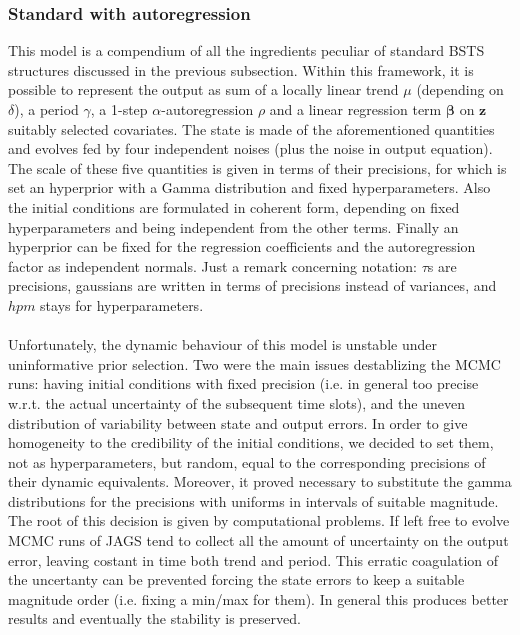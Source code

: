 \documentclass[11pt,twoside]{report}
\begin{document}
\subsubsection{Standard with autoregression}
This model is a compendium of all the ingredients peculiar of standard BSTS structures discussed in the previous subsection. Within this framework, it is possible to represent the output as sum of a locally linear trend $ \mu $ (depending on $ \delta $), a period $ \gamma $, a 1-step $ \alpha $-autoregression $ \rho $ and a linear regression term $ \boldsymbol{\beta} $ on $ \mathbf{z}$ suitably selected covariates. The state is made of the aforementioned quantities and evolves fed by four independent noises (plus the noise in output equation). The scale of these five quantities is given in terms of their precisions, for which is set an hyperprior with a Gamma distribution and fixed hyperparameters. Also the initial conditions are formulated in coherent form, depending on fixed hyperparameters and being independent from the other terms. Finally an hyperprior can be fixed for the regression coefficients and the autoregression factor as independent normals. Just a remark concerning  notation: $ \tau $s are precisions, gaussians are written in terms of precisions instead of variances, and $ hpm $ stays for hyperparameters.\\
\\
Unfortunately, the dynamic behaviour of this model is unstable under uninformative prior selection. Two were the main issues destablizing the MCMC runs: having initial conditions with fixed precision (i.e. in general too precise w.r.t. the actual uncertainty of the subsequent time slots), and the uneven distribution of variability between state and output errors. In order to give homogeneity to the credibility of the initial conditions, we decided to set them, not as hyperparameters, but random, equal to the corresponding precisions of their dynamic equivalents. Moreover, it proved necessary to substitute the gamma distributions for the precisions with uniforms in intervals of suitable magnitude. The root of this decision is given by computational problems. If left free to evolve MCMC runs of JAGS tend to collect all the amount of uncertainty on the output error, leaving costant in time both trend and period. This erratic coagulation of the uncertanty can be prevented forcing the state errors to keep a suitable magnitude order (i.e. fixing a min/max for them). In general this produces better results and eventually the stability is preserved.
\end{document}
